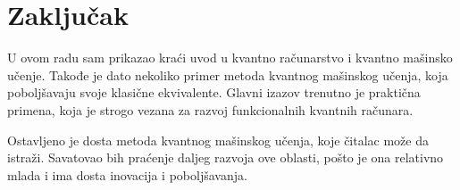 \documentclass[12pt, letterpaper, oneside]{article}
\begin{document}
\section{Zaključak}
U ovom radu sam prikazao kraći uvod u kvantno računarstvo i kvantno mašinsko učenje. Takođe je dato nekoliko primer metoda kvantnog mašinskog učenja, 
koja poboljšavaju svoje klasične ekvivalente. Glavni izazov trenutno je praktična primena, koja je strogo vezana za razvoj funkcionalnih kvantnih računara.

Ostavljeno je dosta metoda kvantnog mašinskog učenja, koje čitalac može da istraži.
Savatovao bih praćenje daljeg razvoja ove oblasti, pošto je ona relativno mlada i ima dosta inovacija i poboljšavanja.

\newpage

\printbibliography
\end{document}
